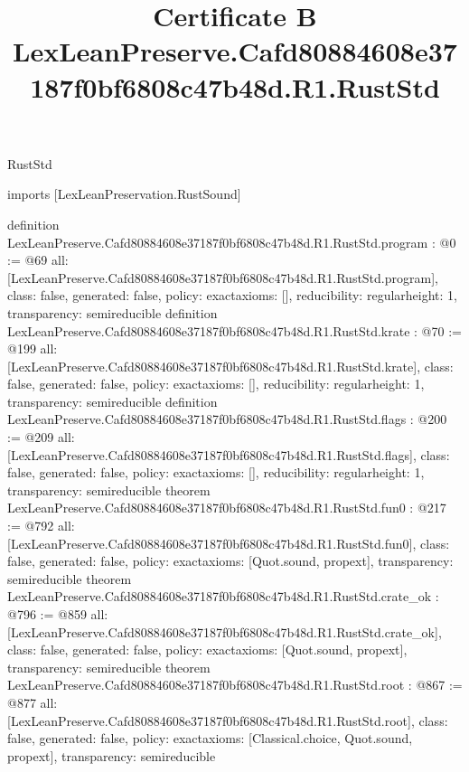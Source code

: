\begin{lexlean}{RustStd}
\title{Certificate B LexLeanPreserve.Cafd80884608e37187f0bf6808c47b48d.R1.RustStd}
\begin{coremodule}
imports [LexLeanPreservation.RustSound]

definition LexLeanPreserve.Cafd80884608e37187f0bf6808c47b48d.R1.RustStd.program : @0 := @69 {
  all: [LexLeanPreserve.Cafd80884608e37187f0bf6808c47b48d.R1.RustStd.program],
  class: false,
  generated: false,
  policy: exact{axioms: []},
  reducibility: regular{height: 1},
  transparency: semireducible
}
definition LexLeanPreserve.Cafd80884608e37187f0bf6808c47b48d.R1.RustStd.krate : @70 := @199 {
  all: [LexLeanPreserve.Cafd80884608e37187f0bf6808c47b48d.R1.RustStd.krate],
  class: false,
  generated: false,
  policy: exact{axioms: []},
  reducibility: regular{height: 1},
  transparency: semireducible
}
definition LexLeanPreserve.Cafd80884608e37187f0bf6808c47b48d.R1.RustStd.flags : @200 := @209 {
  all: [LexLeanPreserve.Cafd80884608e37187f0bf6808c47b48d.R1.RustStd.flags],
  class: false,
  generated: false,
  policy: exact{axioms: []},
  reducibility: regular{height: 1},
  transparency: semireducible
}
theorem LexLeanPreserve.Cafd80884608e37187f0bf6808c47b48d.R1.RustStd.fun0 : @217 := @792 {
  all: [LexLeanPreserve.Cafd80884608e37187f0bf6808c47b48d.R1.RustStd.fun0],
  class: false,
  generated: false,
  policy: exact{axioms: [Quot.sound, propext]},
  transparency: semireducible
}
theorem LexLeanPreserve.Cafd80884608e37187f0bf6808c47b48d.R1.RustStd.crate_ok : @796 := @859 {
  all: [LexLeanPreserve.Cafd80884608e37187f0bf6808c47b48d.R1.RustStd.crate_ok],
  class: false,
  generated: false,
  policy: exact{axioms: [Quot.sound, propext]},
  transparency: semireducible
}
theorem LexLeanPreserve.Cafd80884608e37187f0bf6808c47b48d.R1.RustStd.root : @867 := @877 {
  all: [LexLeanPreserve.Cafd80884608e37187f0bf6808c47b48d.R1.RustStd.root],
  class: false,
  generated: false,
  policy: exact{axioms: [Classical.choice, Quot.sound, propext]},
  transparency: semireducible
}


\end{coremodule}
\end{lexlean}
